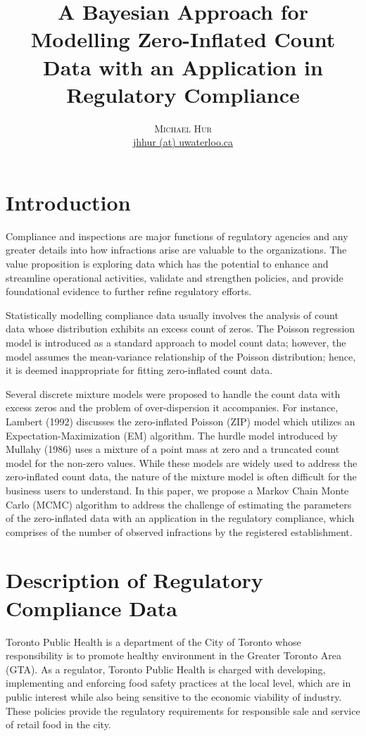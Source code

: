 \documentclass[twoside,onecolumn]{article}
\title{A Bayesian Approach for Modelling Zero-Inflated Count Data with an Application in Regulatory Compliance} %
\author{%
\textsc{Michael Hur} \\[1ex] %
\normalsize \href{mailto:jhhur@uwaterloo.ca}{jhhur (at) uwaterloo.ca} %
}
\date{} %
\begin{document}
\maketitle


\section{Introduction}
Compliance and inspections are major functions of regulatory agencies and any greater details into how infractions arise are valuable to the organizations. The value proposition is exploring data which has the potential to enhance and streamline operational activities, validate and strengthen policies, and provide foundational evidence to further refine regulatory efforts.

Statistically modelling compliance data usually involves the analysis of count data whose distribution exhibits an excess count of zeros. The Poisson regression model is introduced as a standard approach to model count data; however, the model assumes the mean-variance relationship of the Poisson distribution; hence, it is deemed inappropriate for fitting zero-inflated count data.

Several discrete mixture models were proposed to handle the count data with excess zeros and the problem of over-dispersion it accompanies. For instance, Lambert (1992)\cite{Lambert} discusses the zero-inflated Poisson (ZIP) model which utilizes an Expectation-Maximization (EM) algorithm. The hurdle model introduced by Mullahy (1986)\cite{Mullahy} uses a mixture of a point mass at zero and a truncated count model for the non-zero values. While these models are widely used to address the zero-inflated count data, the nature of the mixture model is often difficult for the business users to understand. In this paper, we propose a Markov Chain Monte Carlo (MCMC) algorithm to address the challenge of estimating the parameters of the zero-inflated data with an application in the regulatory compliance, which comprises of the number of observed infractions by the registered establishment. 


\section{Description of Regulatory Compliance Data}
Toronto Public Health is a department of the City of Toronto whose responsibility is to promote healthy environment in the Greater Toronto Area (GTA). As a regulator, Toronto Public Health is charged with developing, implementing and enforcing food safety practices at the local level, which are in public interest while also being sensitive to the economic viability of industry. These policies provide the regulatory requirements for responsible sale and service of retail food in the city.
\end{document}
